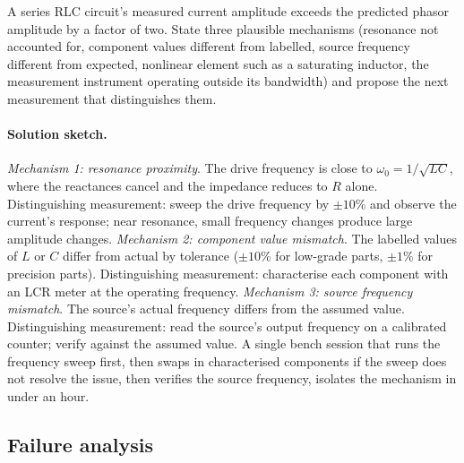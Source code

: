 \begin{exercise}
A series RLC circuit's measured current amplitude exceeds the
predicted phasor amplitude by a factor of two. State three
plausible mechanisms (resonance not accounted for, component
values different from labelled, source frequency different from
expected, nonlinear element such as a saturating inductor, the
measurement instrument operating outside its bandwidth) and
propose the next measurement that distinguishes them.

\paragraph{Solution sketch.}
\emph{Mechanism 1: resonance proximity}. The drive frequency is
close to $\omega_{0} = 1/\sqrt{LC}$, where the reactances cancel
and the impedance reduces to $R$ alone. Distinguishing
measurement: sweep the drive frequency by $\pm 10\%$ and observe
the current's response; near resonance, small frequency changes
produce large amplitude changes.
\emph{Mechanism 2: component value mismatch}. The labelled values
of $L$ or $C$ differ from actual by tolerance ($\pm 10\%$ for
low-grade parts, $\pm 1\%$ for precision parts). Distinguishing
measurement: characterise each component with an LCR meter at
the operating frequency.
\emph{Mechanism 3: source frequency mismatch}. The source's
actual frequency differs from the assumed value. Distinguishing
measurement: read the source's output frequency on a calibrated
counter; verify against the assumed value.
A single bench session that runs the frequency sweep first, then
swaps in characterised components if the sweep does not resolve
the issue, then verifies the source frequency, isolates the
mechanism in under an hour.
\end{exercise}

\subsection*{Failure analysis}

